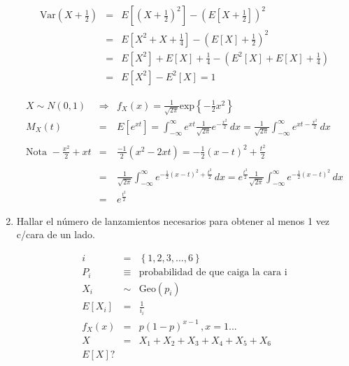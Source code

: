 \begin{enumerate}
                                                                                                                                                 \begin{eqnarray*}
\textrm{Var} \left( X + \frac{1}{2}  \right)&=&  E \left[\left(X + \frac{1}{2} \right)^2 \right]- \left( E \left[X + \frac{1}{2} \right]  \right)^2\\
&=& E \left[X^2 + X + \frac{1}{4} \right] - \left( E \left[X \right] + \frac{1}{2} \right)^2\\
&=& E \left[X ^ 2 \right] +  E \left[X \right]+ \frac{1}{4} - \left( E^2 \left[X \right]+ E \left[ X\right]+ \frac{1}{4} \right)\\
&=& E \left[X^2 \right] - E^2\left[X \right] = 1
\end{eqnarray*}

\begin{eqnarray*}
X \sim N \left( 0,1 \right) &\Rightarrow & f_{X} \left( x \right) = \frac{1}{ \sqrt{2 \pi}} \textrm{exp} \left\{- \frac{1}{2} x^2 \right\}\\
M_{X} \left(t \right) &=& E\left[e^{xt} \right] = \int _{-\infty}^{\infty} e^{xt} \frac{1}{\sqrt{2 \pi}} e ^{- \frac{x^2}{2}} \, dx = \frac{1}{\sqrt{2 \pi}} \int _{-\infty}^{\infty}  e^{xt- \frac{x^2}{2}} \, dx\\\\
 \textrm{Nota }-\frac{x^2}{2} + xt &=& \frac{-1}{2} \left(x^2 - 2xt \right) = - \frac{1}{2} \left(x-t \right)^2 + \frac{t^2}{2}\\\\ 
& = &\frac{1}{\sqrt{2\pi}}\int _{-\infty}^{\infty} e^{- \frac{1}{2} \left(x-t \right)^2 + \frac{t^2}{2}}  \, dx = e^\frac{t^2}{2} \frac{1}{\sqrt{2\pi}}\int _{-\infty}^{\infty} e^{- \frac{1}{2} \left(x-t \right)^2} \, dx\\
&=& e^{\frac{t^2}{2}}
\end{eqnarray*}

\item
Hallar el n\'umero de lanzamientos necesarios para obtener al menos 1 vez c/cara de un lado.

\begin{eqnarray*}
i &=& \left\{1,2,3,..., 6 \right\}\\
P_{i} &\equiv & \textrm{probabilidad de que caiga la cara i} \\
X_{i} &\sim & \textrm{Geo} \left(p_{i} \right)\\
E \left[X_{i} \right] &=& \frac{1}{i_{i}}\\
f_{X} \left(x \right) &=& p \left(1-p \right)^{x-1}\, , x=1...\\
X&=&X_{1}+X_{2}+X_{3}+X_{4}+X_{5}+X_{6}\\
 E \left[ X \right] ?
 \end{eqnarray*}
 

\end{enumerate}
